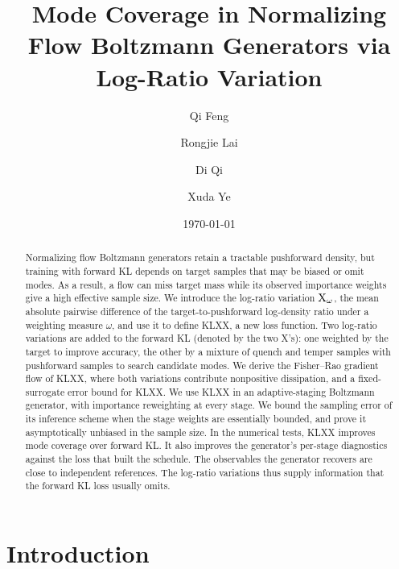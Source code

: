 \documentclass{article}
\title{Mode Coverage in Normalizing Flow Boltzmann Generators via Log-Ratio Variation}
\author[1]{Qi Feng}
\author[2]{Rongjie Lai}
\author[2]{Di Qi}
\author[2]{Xuda Ye}
\affil[1]{Department of Mathematics, Florida State University, Tallahassee, FL 32306}
\affil[2]{Department of Mathematics, Purdue University, West Lafayette, IN 47907}
\date{\today}
\begin{document}
\maketitle

\begin{abstract}
Normalizing flow Boltzmann generators retain a tractable pushforward density, but training with forward KL depends on target samples that may be biased or omit modes. As a result, a flow can miss target mass while its observed importance weights give a high effective sample size. We introduce the log-ratio variation $\mathrm{X}_\omega$, the mean absolute pairwise difference of the target-to-pushforward log-density ratio under a weighting measure $\omega$, and use it to define KLXX, a new loss function. Two log-ratio variations are added to the forward KL (denoted by the two X's): one weighted by the target to improve accuracy, the other by a mixture of quench and temper samples with pushforward samples to search candidate modes. We derive the Fisher--Rao gradient flow of KLXX, where both variations contribute nonpositive dissipation, and a fixed-surrogate error bound for KLXX. We use KLXX in an adaptive-staging Boltzmann generator, with importance reweighting at every stage. We bound the sampling error of its inference scheme when the stage weights are essentially bounded, and prove it asymptotically unbiased in the sample size. In the numerical tests, KLXX improves mode coverage over forward KL. It also improves the generator's per-stage diagnostics against the loss that built the schedule. The observables the generator recovers are close to independent references. The log-ratio variations thus supply information that the forward KL loss usually omits.
\end{abstract}

\par\medskip
\noindent{}
\par\medskip

\section{Introduction}
\label{sec: intro}
\end{document}
